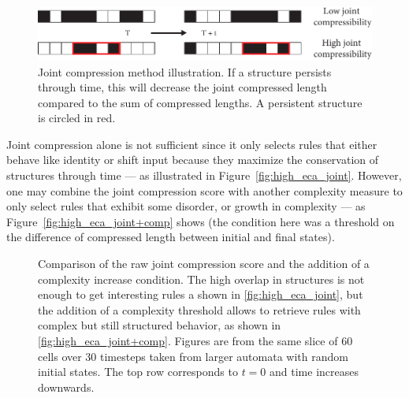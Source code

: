 \begin{figure}[htbp]
  \centering
  \includegraphics[width=.8\linewidth]{figures/joint_comp_1d}
  \caption{Joint compression method illustration. If a structure persists
    through time, this will decrease the joint compressed length compared to the
    sum of compressed lengths. A persistent structure is circled in red.}
  \label{fig:joint_schema}
\end{figure}

Joint compression alone is not sufficient since it only selects rules that
either behave like identity or shift input because they maximize the
conservation of structures through time --- as illustrated in
Figure~\ref{fig:high_eca_joint}. However, one may combine the joint compression
score with another complexity measure to only select rules that exhibit some
disorder, or growth in complexity --- as Figure~\ref{fig:high_eca_joint+comp}
shows (the condition here was a threshold on the difference of compressed length
between initial and final states).

\begin{figure}[htbp]
  \centering
  \hfil
  \caption{Comparison of the raw joint compression score and the addition of a
    complexity increase condition. The high overlap in structures is not enough
    to get interesting rules a shown in \ref{fig:high_eca_joint}, but the
    addition of a complexity threshold allows to retrieve rules with complex but
    still structured behavior, as shown in \ref{fig:high_eca_joint+comp}.
    Figures are from the same slice of 60 cells over 30 timesteps taken from
    larger automata with random initial states. The top row corresponds to $t =
    0$ and time increases downwards.}
  \label{fig:joint_highest}
\end{figure}

